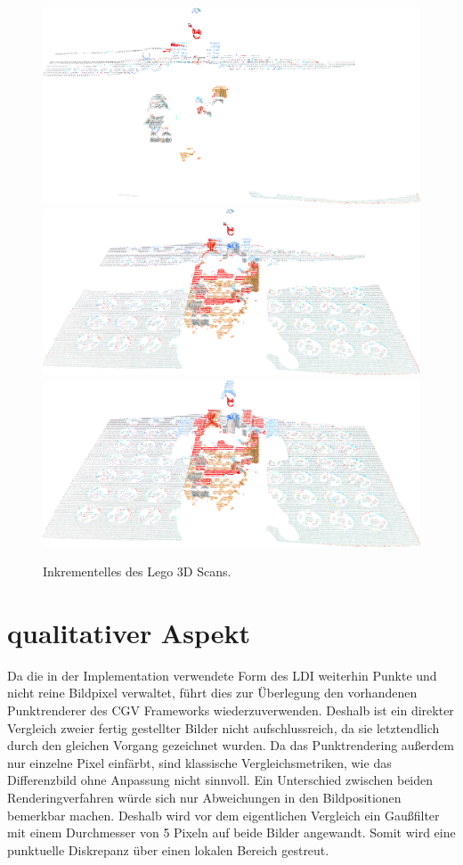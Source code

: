 \documentclass[hyperref, beleg, german]{cgvpub}
\begin{document}
\begin{figure}
	\centering
	\includegraphics[width = \linewidth]{images/Lego/126}
	\includegraphics[width = \linewidth]{images/Lego/150}
	\includegraphics[width = \linewidth]{images/Lego/170}
	\caption{Inkrementelles des Lego 3D Scans.}%
	\label{img:lego}
\end{figure}

\section{qualitativer Aspekt}

Da die in der Implementation verwendete Form des LDI weiterhin Punkte und nicht
reine Bildpixel verwaltet, führt dies zur Überlegung den vorhandenen
Punktrenderer des CGV Frameworks wiederzuverwenden. Deshalb ist ein direkter
Vergleich zweier fertig gestellter Bilder nicht aufschlussreich, da sie
letztendlich durch den gleichen Vorgang gezeichnet wurden. Da das
Punktrendering außerdem nur einzelne Pixel einfärbt, sind klassische
Vergleichsmetriken, wie das Differenzbild ohne Anpassung nicht sinnvoll. Ein
Unterschied zwischen beiden Renderingverfahren würde sich nur Abweichungen in
den Bildpositionen bemerkbar machen. Deshalb wird vor dem eigentlichen
Vergleich ein Gaußfilter mit einem Durchmesser von 5 Pixeln auf beide Bilder
angewandt. Somit wird eine punktuelle Diskrepanz über einen lokalen Bereich
gestreut.
\end{document}
